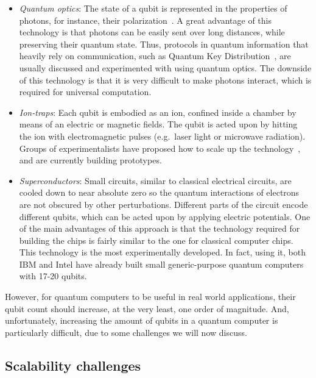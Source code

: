 \begin{itemize}

\item \textit{Quantum optics}: The state of a qubit is represented in the properties of photons, for instance, their polarization~\citep{OpticsQC}. A great advantage of this technology is that photons can be easily sent over long distances, while preserving their quantum state. Thus, protocols in quantum information that heavily rely on communication, such as Quantum Key Distribution~\citep{QKD}, are usually discussed and experimented with using quantum optics. The downside of this technology is that it is very difficult to make photons interact, which is required for universal computation.

\item \textit{Ion-traps}: Each qubit is embodied as an ion, confined inside a chamber by means of an electric or magnetic fields. The qubit is acted upon by hitting the ion with electromagnetic pulses (e.g.\ laser light or microwave radiation). Groups of experimentalists have proposed how to scale up the technology~\citep{HensingerIonTraps}, and are currently building prototypes.

\item \textit{Superconductors}: Small circuits, similar to classical electrical circuits, are cooled down to near absolute zero so the quantum interactions of electrons are not obscured by other perturbations. Different parts of the circuit encode different qubits, which can be acted upon by applying electric potentials. One of the main advantages of this approach is that the technology required for building the chips is fairly similar to the one for classical computer chips. This technology is the most experimentally developed. In fact, using it, both IBM and Intel have already built small generic-purpose quantum computers with 17-20 qubits.

\end{itemize}

However, for quantum computers to be useful in real world applications, their qubit count should increase, at the very least, one order of magnitude. And, unfortunately, increasing the amount of qubits in a quantum computer is particularly difficult, due to some challenges we will now discuss.


\subsection{Scalability challenges}
\label{Challenges}

